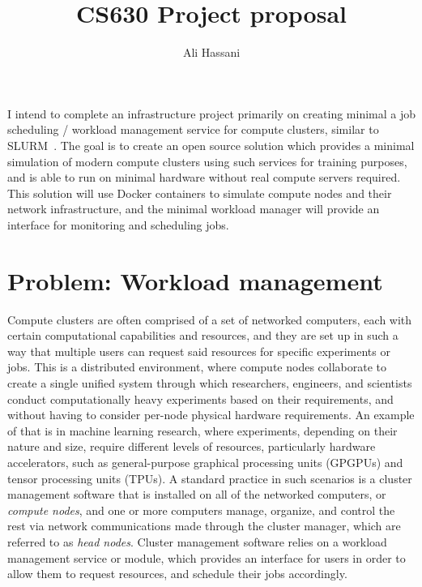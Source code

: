 \documentclass[letterpaper, 11pt]{article}
\title{CS630 Project proposal}
\author{Ali Hassani}
\begin{document}
\maketitle
I intend to complete an infrastructure project primarily on creating minimal a job scheduling / workload management service for 
compute clusters, similar to SLURM~\cite{yoo2003slurm}.
The goal is to create an open source solution which provides a minimal simulation of modern compute clusters using such services
for training purposes, and is able to run on minimal hardware without real compute servers required.
This solution will use Docker containers to simulate compute nodes and their network infrastructure, and the minimal workload
manager will provide an interface for monitoring and scheduling jobs.

\section{Problem: Workload management}
Compute clusters are often comprised of a set of networked computers, each with certain computational capabilities and 
resources, and they are set up in such a way that multiple users can request said resources for specific experiments or jobs.
This is a distributed environment, where compute nodes collaborate to create a single unified system through which
researchers, engineers, and scientists conduct computationally heavy experiments based on their requirements, and without having
to consider per-node physical hardware requirements.
An example of that is in machine learning research, where experiments, depending on their nature and size, require different
levels of resources, particularly hardware accelerators, such as general-purpose graphical processing units (GPGPUs) and tensor
processing units (TPUs).
A standard practice in such scenarios is a cluster management software that is installed on all of the networked computers, or
\textit{compute nodes}, and one or more computers manage, organize, and control the rest via network communications made through
the cluster manager, which are referred to as \textit{head nodes}.
Cluster management software relies on a workload management service or module, which provides an interface for users in
order to allow them to request resources, and schedule their jobs accordingly.
\end{document}
